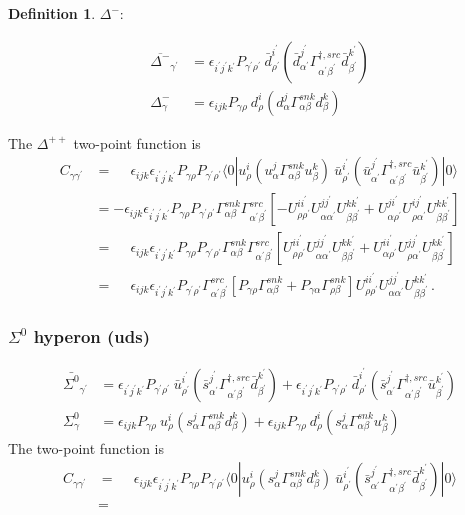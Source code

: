 \documentclass[prd,12pt,superscriptaddress,tightenlines,nofootinbib]{revtex4}
\def\a{{\alpha}}
\def\b{{\beta}}
\def\g{{\gamma}}
\def\G{{\Gamma}}
\def\ip{{i^\prime}}
\def\jp{{j^\prime}}
\def\kp{{k^\prime}}
\def\ap{{\alpha^\prime}}
\def\bp{{\beta^\prime}}
\def\gp{{\gamma^\prime}}
\def\rp{{\rho^\prime}}
\theoremstyle{plain}
\theoremstyle{definition}
\newtheorem{defn}[thm]{Definition}
\theoremstyle{remark}
\begin{document}
\begin{defn}
$\Delta^{-}$: 

\begin{align}
	\overline{\Delta^{-}}_{\gp} &= \epsilon_{\ip\jp\kp} P_{\gp\rp}\ \bar{d}^\ip_\rp (\bar{d}^{\jp}_{\ap} \G^{\dagger,src}_{\ap\bp} \bar{d}^\kp_\bp ) 
	\\
	\Delta^{-}_{\g} &= \epsilon_{ijk} P_{\g\rho}\ d^i_\rho (d^j_\a \G^{snk}_{\a\b} d^k_\b ) 
\end{align}


The $\Delta^{++}$ two-point function is
\begin{align}
C_{\g\gp} &= \phantom{-}\epsilon_{ijk} \epsilon_{\ip\jp\kp} P_{\g\rho} P_{\gp\rp} \langle 0| 
	u^i_\rho (u^j_\a \G^{snk}_{\a\b} u^k_\b ) \ \bar{u}^\ip_\rp (\bar{u}^{\jp}_{\ap} \G^{\dagger,src}_{\ap\bp} \bar{u}^\kp_\bp ) 
	|0\rangle
\nonumber\\ &=
	-\epsilon_{ijk} \epsilon_{\ip\jp\kp} P_{\g\rho} P_{\gp\rp} \G^{snk}_{\a\b} \G^{src}_{\ap\bp}
	\left[ -U^{i\ip}_{\rho\rp} U^{j\jp}_{\a\ap} U^{k\kp}_{\b\bp} 
		+ U^{j\ip}_{\a\rp} U^{i\jp}_{\rho\ap} U^{k\kp}_{\b\bp} 
	\right]
\nonumber\\ &=
	\phantom{-}\epsilon_{ijk} \epsilon_{\ip\jp\kp} P_{\g\rho} P_{\gp\rp} \G^{snk}_{\a\b} \G^{src}_{\ap\bp} 
	\left[
		U^{i\ip}_{\rho\rp} U^{j\jp}_{\a\ap} U^{k\kp}_{\b\bp} 
		+U^{i\ip}_{\a\rp} U^{j\jp}_{\rho\ap} U^{k\kp}_{\b\bp} 
	\right]
\nonumber\\ &=
	\phantom{-}\epsilon_{ijk} \epsilon_{\ip\jp\kp}  P_{\gp\rp}  \G^{src}_{\ap\bp} 
	\left[
		P_{\g\rho} \G^{snk}_{\a\b} + P_{\g\a} \G^{snk}_{\rho\b}
	\right]
	U^{i\ip}_{\rho\rp} U^{j\jp}_{\a\ap} U^{k\kp}_{\b\bp} \, .
\end{align}







\subsubsection{$\Sigma^0$ hyperon (uds)}


\begin{align}
	\bar{\Sigma^0}_{\gp} &= \epsilon_{\ip\jp\kp} P_{\gp\rp}\ \bar{u}^\ip_\rp (\bar{s}^{\jp}_{\ap} \G^{\dagger,src}_{\ap\bp} \bar{d}^\kp_\bp ) 
	+ \epsilon_{\ip\jp\kp} P_{\gp\rp}\ \bar{d}^\ip_\rp (\bar{s}^{\jp}_{\ap} \G^{\dagger,src}_{\ap\bp} \bar{u}^\kp_\bp ) \\
	\Sigma^0_{\g} &= \epsilon_{ijk} P_{\g\rho}\ u^i_\rho (s^j_\a \G^{snk}_{\a\b} d^k_\b ) +  
	\epsilon_{ijk} P_{\g\rho}\ d^i_\rho (s^j_\a \G^{snk}_{\a\b} u^k_\b )
	\end{align}
The two-point function is 
\begin{align}
	C_{\g\gp} &= \phantom{-}\epsilon_{ijk} \epsilon_{\ip\jp\kp} P_{\g\rho} P_{\gp\rp} \langle 0| 
	u^i_\rho (s^j_\a \G^{snk}_{\a\b} d^k_\b ) \ \bar{u}^\ip_\rp (\bar{s}^{\jp}_{\ap} \G^{\dagger,src}_{\ap\bp} \bar{d}^\kp_\bp ) 
	|0\rangle
\nonumber\\ &=
\end{align}


\end{defn}
\end{document}
